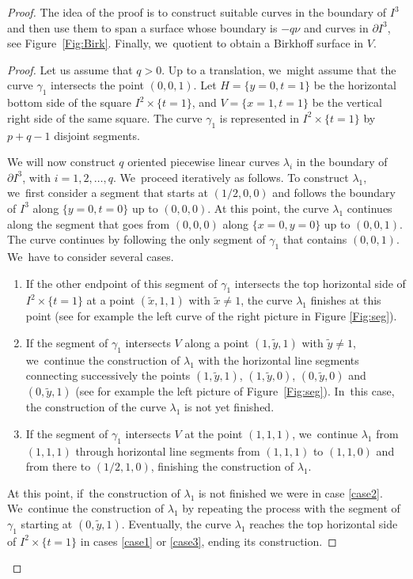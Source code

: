 \begin{proof}
The idea of the proof is to construct suitable curves in the boundary of $I^3$ and then use them to span a surface whose boundary is $-q\nu$ and curves in $\partial I^3$, see Figure~\ref{Fig:Birk}. Finally, we~quotient to obtain a Birkhoff surface in $V$.

\begin{proof}
Let us assume that $q>0$. Up to a translation, we~might assume that the curve $\gamma_1$ intersects the point $(0,0,1)$. Let $H=\{y=0, t=1\}$ be the horizontal bottom side of the square $I^2\times \{t=1\}$, and $V=\{x=1, t=1\}$ be the vertical right side of the same square. The curve $\gamma_1$ is represented in $I^2\times \{t=1\}$ by $p+q-1$ disjoint segments.

We will now construct $q$ oriented piecewise linear curves $\lambda_i$ in the boundary of $\partial I^3$, with $i=1,2,\ldots,q$. We~proceed iteratively as follows. To construct $\lambda_1$, we~first consider a segment that starts at $(1/2,0,0)$ and follows the boundary of $I^3$ along $\{y=0,t=0\}$ up to $(0,0,0)$. At this point, the curve $\lambda_1$ continues along the segment that goes from $(0,0,0)$ along $\{x=0, y=0\}$ up to $(0,0,1)$. The curve continues by following the only segment of $\gamma_1$ that contains $(0,0,1)$. We~have to consider several cases.
\begin{enumerate}
\item\label{case1} If the other endpoint of this segment of $\gamma_1$ intersects the top horizontal side of $I^2\times\{t=1\}$ at a point $(\widetilde x,1 ,1)$ with $\widetilde x\neq 1$, the curve $\lambda_1$ finishes at this point (see for example the left curve of the right picture in Figure \ref{Fig:seg}).
\item\label{case2} If the segment of $\gamma_1$ intersects $V$ along a point $(1, \widetilde y, 1)$ with $\widetilde y\neq 1$, we~continue the construction of $\lambda_1$ with the horizontal line segments connecting successively the points $(1,\widetilde y, 1)$, $(1,\widetilde y, 0)$, $(0,\widetilde y,0)$ and $(0,\widetilde y, 1)$ (see for example the left picture of Figure~\ref{Fig:seg}). In~this case, the construction of the curve $\lambda_1$ is not yet finished.
\item\label{case3} If the segment of $\gamma_1$ intersects $V$ at the point $(1, 1, 1)$, we~continue $\lambda_1$ from $(1,1,1)$ through horizontal line segments from $(1,1,1)$ to $(1,1,0)$ and from there to $(1/2,1,0)$, finishing the construction of $\lambda_1$.
\end{enumerate}
At this point, if~the construction of $\lambda_1$ is not finished we were in case \eqref{case2}. We~continue the construction of $\lambda_1$ by repeating the process with the segment of $\gamma_1$ starting at $(0,\widetilde y,1)$. Eventually, the curve $\lambda_1$ reaches the top horizontal side of $I^2\times\{t=1\}$ in cases \eqref{case1} or \eqref{case3}, ending its construction.


\end{proof}
\end{proof}
